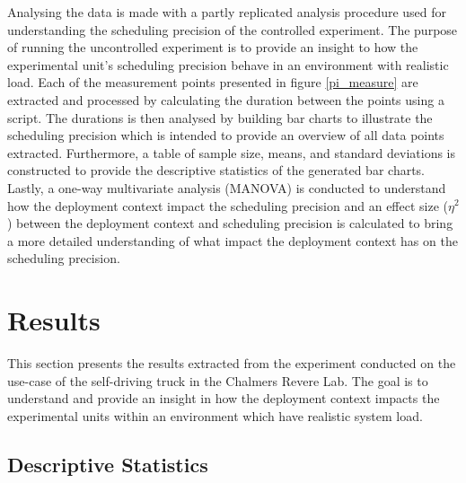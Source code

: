 Analysing the data is made with a partly replicated analysis procedure used for understanding the scheduling precision of the controlled experiment. The purpose of running the uncontrolled experiment is to provide an insight to how the experimental unit's scheduling precision behave in an environment with realistic load. Each of the measurement points presented in figure \ref{pi_measure} are extracted and processed by calculating the duration between the points using a script. The durations is then analysed by building bar charts to illustrate the scheduling precision which is intended to provide an overview of all data points extracted. Furthermore, a table of sample size, means, and standard deviations is constructed to provide the descriptive statistics of the generated bar charts. Lastly, a one-way multivariate analysis (MANOVA) is conducted to understand how the deployment context impact the scheduling precision and an effect size ($\eta^{2}$) between the deployment context and scheduling precision is calculated to bring a more detailed understanding of what impact the deployment context has on the scheduling precision.\\



\section{Results}
\label{section:results-usecase-experiment}

This section presents the results extracted from the experiment conducted on the use-case of the self-driving truck in the Chalmers Revere Lab. The goal is to understand and provide an insight in how the deployment context impacts the experimental units within an environment which have realistic system load.\\


\subsection{Descriptive Statistics}

